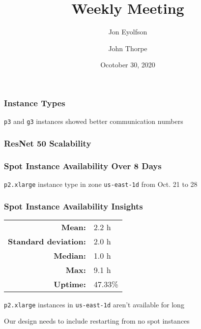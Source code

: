 

\title{Weekly Meeting}
\date{Ocotober 30, 2020}
\author{Jon Eyolfson \and John Thorpe}



  \begin{frame}[plain]
    \titlepage
  \end{frame}

  \setcounter{framenumber}{0}

  \begin{frame}
    \frametitle{Instance Types}

    \texttt{p3} and \texttt{g3} instances showed better communication numbers

  \end{frame}

  \begin{frame}
    \frametitle{ResNet 50 Scalability}

  \end{frame}

  \begin{frame}
    \frametitle{Spot Instance Availability Over 8 Days}

    \begin{center}
      
    \end{center}

    \texttt{p2.xlarge} instance type in zone \texttt{us-east-1d} from
    Oct. 21 to 28
  \end{frame}

  \begin{frame}
    \frametitle{Spot Instance Availability Insights}

    \begin{tabular}{rl}
      \textbf{Mean:}               & 2.2 h   \\
      \textbf{Standard deviation:} & 2.0 h   \\
      \textbf{Median:}             & 1.0 h   \\
      \textbf{Max:}                & 9.1 h   \\
      \textbf{Uptime:}             & 47.33\% \\
    \end{tabular}

    \vspace{3em}

    \texttt{p2.xlarge} instances in \texttt{us-east-1d} aren't available for long

    \vspace{1em}

    Our design needs to include restarting from no spot instances
  \end{frame}

